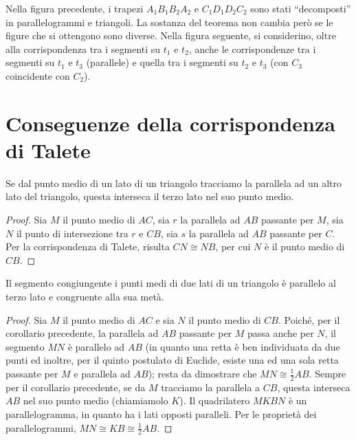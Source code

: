 \osservazione Nella figura precedente, i trapezi $A_1B_1B_2A_2$ e $C_1D_1D_2C_2$ sono stati ``decomposti'' in parallelogrammi e triangoli. La sostanza del teorema non cambia però se le figure che si ottengono sono diverse.
Nella figura seguente, si considerino, oltre alla corrispondenza tra i segmenti su $t_1$ e $t_2$, anche le corrispondenze tra i segmenti su $t_1$ e $t_3$ (parallele) e quella tra i segmenti su $t_2$ e $t_3$ (con $C_3$ coincidente con $C_2$).

\section{Conseguenze della corrispondenza di Talete}

\begin{corollario}
Se dal punto medio di un lato di un triangolo tracciamo la parallela ad un altro lato del triangolo, questa interseca il terzo lato nel suo punto medio.
\end{corollario}

\begin{proof}
Sia $M$ il punto medio di $AC$, sia $r$ la parallela ad $AB$ passante per $M$, sia $N$ il punto di intersezione tra $r$ e $CB$,  sia $s$ la parallela ad $AB$ passante per $C$. Per  la corrispondenza di Talete, risulta $CN\cong NB$, per cui $N$ è il punto medio di $CB$.
\end{proof}

\begin{corollario}
Il segmento congiungente i punti medi di due lati di un triangolo è parallelo al terzo lato e congruente alla sua metà.
\end{corollario}

\begin{proof}
Sia $M$ il punto medio di $AC$ e sia $N$ il punto medio di $CB$. Poiché, per il corollario precedente, la parallela ad $AB$ passante per $M$ passa anche per $N$, il segmento $MN$ è parallelo ad $AB$ (in quanto una retta è ben individuata da due punti ed inoltre, per il quinto postulato di Euclide, esiste una ed una sola retta passante per $M$ e parallela ad $AB$); resta da dimostrare che $MN\cong \frac{1}{2}AB$. Sempre per il corollario precedente, se da $M$ tracciamo la parallela a $CB$, questa interseca $AB$ nel suo punto medio (chiamiamolo $K$). Il quadrilatero $MKBN$ è un parallelogramma, in quanto ha i lati opposti paralleli. Per le proprietà dei parallelogrammi, $MN\cong KB\cong \frac{1}{2}AB$.
\end{proof}

\newpage



\cleardoublepage

